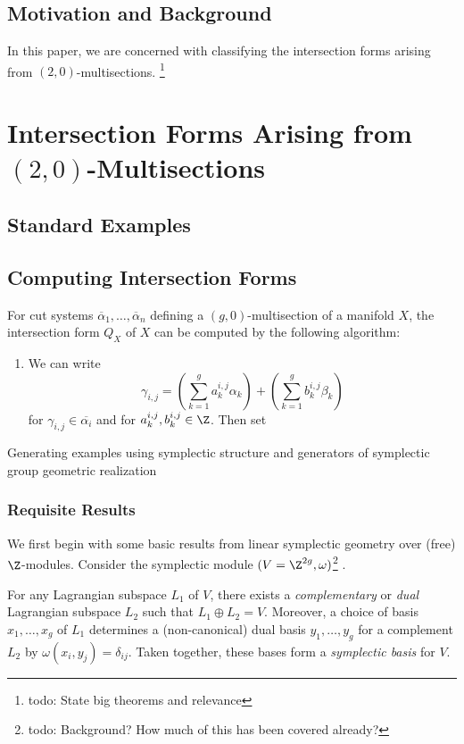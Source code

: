 \subsection{Motivation and Background}

In this paper, we are concerned with classifying the intersection forms arising from $(2,0)$-multisections. \footnote{todo: State big theorems and relevance}

\section{Intersection Forms Arising from $(2,0)$-Multisections}
\subsection{Standard Examples}

\subsection{Computing Intersection Forms}

\begin{theorem}
	For cut systems $\overline{\alpha}_1, \dots, \overline{\alpha}_n$ defining a $(g,0)$-multisection of a manifold $X$, the intersection form $Q_X$ of $X$ can be computed by the following algorithm:
	\begin{enumerate}
		\item We can write \[\gamma_{i,j} = \left( \sum_{k = 1}^g a_k^{i,j} \alpha_k \right) + \left( \sum_{k = 1}^g b_k^{i,j}\beta_k \right)\] for $\gamma_{i,j} \in \overline{\alpha_i}$ and for $a^{i,j}_k,b^{i,j}_k \in \Z$. Then set 
	\end{enumerate}
\end{theorem}


Generating examples using symplectic structure and generators of symplectic group
geometric realization

\subsubsection*{Requisite Results}
We first begin with some basic results from linear symplectic geometry over (free) $\Z$-modules. Consider the symplectic module $(V = \Z^{2g}, \omega)$\footnote{todo: Background? How much of this has been covered already?} .
\begin{theorem}
	For any Lagrangian subspace $L_1$ of $V$, there exists a \textit{complementary} or \textit{dual} Lagrangian subspace $L_2$ such that $L_1 \oplus L_2 = V$. Moreover, a choice of basis $x_1,\dots,x_g$ of $L_1$ determines a (non-canonical) dual basis $y_1,\dots,y_g$ for a complement $L_2$ by $\omega(x_i, y_j) = \delta_{ij}$. Taken together, these bases form a \textit{symplectic basis} for $V$. 
\end{theorem}

